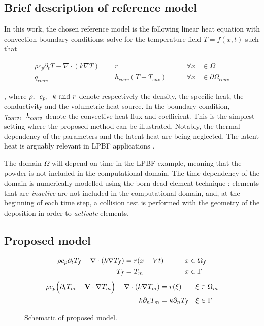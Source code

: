 \subsection{Brief description of reference model}
In this work, the chosen reference model is
the following linear heat equation with convection
boundary conditions: solve for the temperature
field $T = f(x, t)$ such that

\begin{align*}
  \rho c_p \partial_t T - \nabla \cdot (k \nabla T) &= r
  \qquad &\forall x &\in \Omega\\
  q_{conv} &= h_{conv} ( T - T_{env} ) \qquad & \forall x &\in \partial \Omega {}_{conv}
\end{align*}

, where $\rho, \enskip c_p, \enskip k \textrm{ and } r$
denote respectively
the density, the specific heat, the conductivity and the volumetric
heat source. In the boundary condition,
$q_{conv}, \enskip h_{conv}$ denote the convective heat flux
and coefficient.
This is the simplest setting where
the proposed method can be illustrated.
Notably, the thermal dependency of the parameters
and the latent heat are being neglected. The latent heat is
arguably relevant in LPBF applications
\cite{VanElsen2007, Hodge2021}.\par

The domain $\Omega$ will depend on time in the LPBF example,
meaning that the powder is not included in the computational
domain. The time dependency of the domain is numerically modelled
using  the born-dead element technique \cite{Chiumenti2010}:
elements that are \textit{inactive} are not included in the
computational domain,
and, at the beginning of each time step, a collision test
is performed with the geometry of the deposition
in order to \textit{activate} elements.

\subsection{Proposed model}


\begin{align}
  \label{eq:pdeddf}
  \rho c_p \partial_t T_f - \nabla \cdot (k \nabla T_f) &= r(x - Vt) \qquad &x &\in \Omega_f\\
  T_f &= T_m \qquad &x &\in \Gamma \notag
\end{align}
\begin{align}
  \label{eq:pdeddm}
  \rho c_p \Big( \partial_t T_m - \mathbf{V} \cdot \nabla T_m \Big) -
  \nabla \cdot ( k \nabla T_m) &= r(\xi)  &\xi &\in \Omega_m\\
  k \partial_n T_m &= k \partial_n T_f  &\xi &\in \Gamma \notag
\end{align}

\begin{figure}
  \caption{Schematic of proposed model.}
  \label{fig:schematic}
\end{figure}


\iffalse
Show reference model
Go over limitations
Introduce my model
\fi
